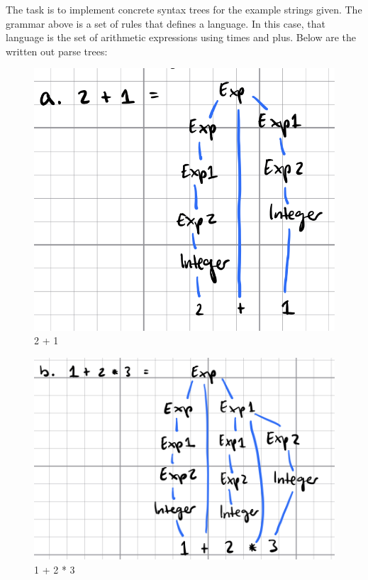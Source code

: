 \documentclass{article}
\theoremstyle{theorem}
\theoremstyle{definition}
\theoremstyle{remark}
\begin{document}
The task is to implement concrete syntax trees for the example strings given. The grammar above is a set of rules that defines a language. In this case, that language is the set of arithmetic expressions using times and plus. Below are the written out parse trees:

\begin{figure}[H]
\begin{center}
\includegraphics[scale=0.4]{img/C1.png}
\end{center}
\caption{2 + 1}\label{C1}
\end{figure}

\begin{figure}[H]
\begin{center}
\includegraphics[scale=0.4]{img/C2.png}
\end{center}
\caption{1 + 2 * 3}\label{C2}
\end{figure}
\end{document}
